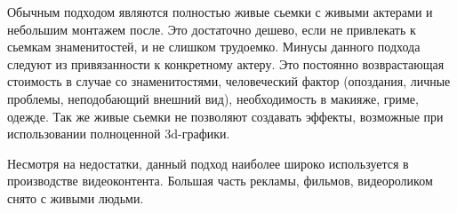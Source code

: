 Обычным подходом являются полностью живые сьемки с живыми актерами и небольшим монтажем после. Это достаточно дешево, если не привлекать к сьемкам знаменитостей, и не слишком трудоемко. Минусы данного подхода следуют из привязанности к конкретному актеру.
Это постоянно возврастающая стоимость в случае со знаменитостями, человеческий фактор (опоздания, личные проблемы, неподобающий внешний вид), необходимость в макияже, гриме, одежде. Так же живые сьемки не позволяют создавать эффекты, возможные при использовании полноценной 3d-графики.

Несмотря на недостатки, данный подход наиболее широко используется в производстве видеоконтента. Большая часть рекламы, фильмов, видеороликом снято с живыми людьми. 
